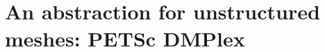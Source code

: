 \documentclass[thesis]{subfiles}
\begin{document}

\section{An abstraction for unstructured meshes: PETSc DMPlex}




%
%
%
%
%
\end{document}
